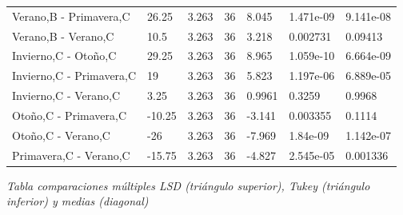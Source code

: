 \documentclass[]{book}
\theoremstyle{definition}
\theoremstyle{definition}
\theoremstyle{definition}
\theoremstyle{remark}
\begin{document}
\begin{longtable}[]{@{}lllllll@{}}
Verano,B - Primavera,C & 26.25 & 3.263 & 36 & 8.045 & 1.471e-09 &
9.141e-08\tabularnewline
Verano,B - Verano,C & 10.5 & 3.263 & 36 & 3.218 & 0.002731 &
0.09413\tabularnewline
Invierno,C - Otoño,C & 29.25 & 3.263 & 36 & 8.965 & 1.059e-10 &
6.664e-09\tabularnewline
Invierno,C - Primavera,C & 19 & 3.263 & 36 & 5.823 & 1.197e-06 &
6.889e-05\tabularnewline
Invierno,C - Verano,C & 3.25 & 3.263 & 36 & 0.9961 & 0.3259 &
0.9968\tabularnewline
Otoño,C - Primavera,C & -10.25 & 3.263 & 36 & -3.141 & 0.003355 &
0.1114\tabularnewline
Otoño,C - Verano,C & -26 & 3.263 & 36 & -7.969 & 1.84e-09 &
1.142e-07\tabularnewline
Primavera,C - Verano,C & -15.75 & 3.263 & 36 & -4.827 & 2.545e-05 &
0.001336\tabularnewline
\bottomrule
\end{longtable}

\emph{Tabla comparaciones múltiples LSD (triángulo superior), Tukey
(triángulo inferior) y medias (diagonal)}
\end{document}

